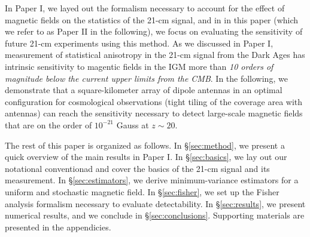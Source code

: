 In Paper I, we layed out the formalism necessary to account for the effect of  magnetic fields on the statistics of the 21-cm signal, and in in this paper (which we refer to as Paper II in the following), we focus on evaluating the sensitivity of future 21-cm experiments using this method. As we discussed in Paper I, measurement of statistical anisotropy in the 21-cm signal from the Dark Ages has intrinsic sensitivity to magentic fields in the IGM more than \textit{10 orders of magnitude below the current upper limits from the CMB}. In the following, we demonstrate that a square-kilometer array of dipole antennas in an optimal configuration for cosmological observations (tight tiling of the coverage area with antennas) can reach the sensitivity necessary to detect large-scale magnetic fields that are on the order of $10^{-21}$ Gauss at $z\sim 20$. 

The rest of this paper is organized as follows. In \S\ref{sec:method}, we present a quick overview of the main results in Paper I. In \S\ref{sec:basics}, we lay out our notational conventionad and cover the basics of the 21-cm signal and its measurement. In \S\ref{sec:estimators}, we derive minimum-variance estimators for a uniform and stochastic magnetic field. In \S\ref{sec:fisher}, we set up the Fisher analysis formalism necessary to evaluate detectability. In \S\ref{sec:results}, we present numerical results, and we conclude in \S\ref{sec:conclusions}. Supporting materials are presented in the appendicies.